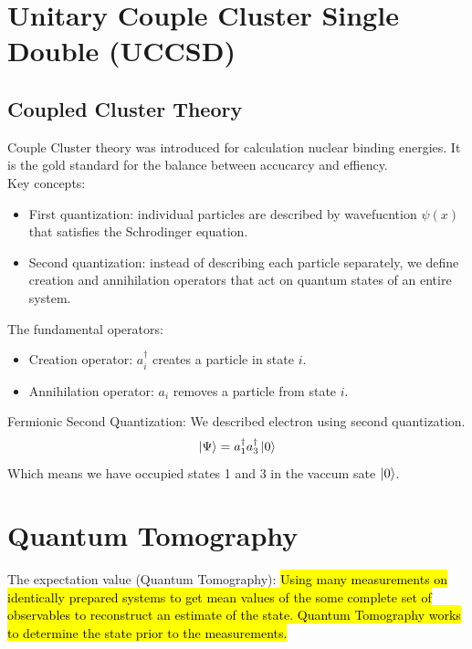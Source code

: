 \documentclass{article}
\begin{document}
\section{Unitary Couple Cluster Single Double (UCCSD)}
\subsection{Coupled Cluster Theory}
Couple Cluster theory was introduced for calculation nuclear binding energies. It is the gold standard for the balance between accucarcy and effiency. \\
Key concepts: 
\begin{itemize}
	\item First quantization: individual particles are described by wavefucntion \(\psi(x)\) that satisfies the Schrodinger equation.
	\item Second quantization: instead of describing each particle separately, we define creation and annihilation operators that act on quantum states of an entire system.
\end{itemize}
The fundamental operators:
\begin{itemize}
	\item Creation operator: \(a^\dagger_i\) creates a particle in state \(i\).
	\item Annihilation operator: \(a_i\) removes a particle from state \(i\).
\end{itemize}
Fermionic Second Quantization: We described electron using second quantization. 
\[\ket{\Psi} = a^\dagger_1 a^\dagger_3 \ket{0}\]
Which means we have occupied states 1 and 3 in the vaccum sate \(\ket{0}\).\\
\section{Quantum Tomography}
The expectation value (Quantum Tomography):
\hl{Using many measurements on identically prepared systems to get mean values of the some complete set of observables to reconstruct an estimate of the state. Quantum Tomography works to
	determine the state prior to the measurements.}\\
\end{document}

